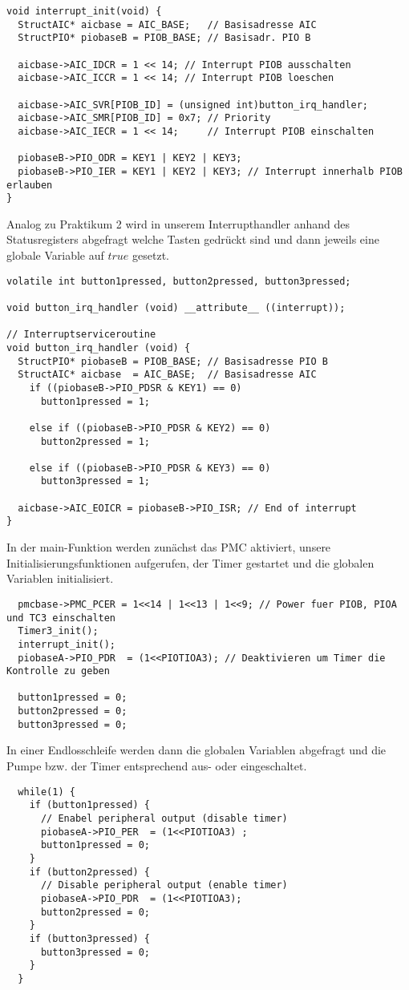\documentclass[11pt,a4paper,parskip=half]{scrartcl}
\begin{document}
\begin{lstlisting}
void interrupt_init(void) {
  StructAIC* aicbase = AIC_BASE;   // Basisadresse AIC
  StructPIO* piobaseB = PIOB_BASE; // Basisadr. PIO B

  aicbase->AIC_IDCR = 1 << 14; // Interrupt PIOB ausschalten
  aicbase->AIC_ICCR = 1 << 14; // Interrupt PIOB loeschen

  aicbase->AIC_SVR[PIOB_ID] = (unsigned int)button_irq_handler;
  aicbase->AIC_SMR[PIOB_ID] = 0x7; // Priority
  aicbase->AIC_IECR = 1 << 14;     // Interrupt PIOB einschalten

  piobaseB->PIO_ODR = KEY1 | KEY2 | KEY3;
  piobaseB->PIO_IER = KEY1 | KEY2 | KEY3; // Interrupt innerhalb PIOB erlauben
}
\end{lstlisting}

\newpage

Analog zu Praktikum 2 wird in unserem Interrupthandler anhand des Statusregisters abgefragt welche Tasten gedrückt sind und dann jeweils eine globale Variable auf $true$ gesetzt.

\begin{lstlisting}
volatile int button1pressed, button2pressed, button3pressed;

void button_irq_handler (void) __attribute__ ((interrupt));

// Interruptserviceroutine
void button_irq_handler (void) {
  StructPIO* piobaseB = PIOB_BASE; // Basisadresse PIO B
  StructAIC* aicbase  = AIC_BASE;  // Basisadresse AIC
    if ((piobaseB->PIO_PDSR & KEY1) == 0)
      button1pressed = 1;

    else if ((piobaseB->PIO_PDSR & KEY2) == 0)
      button2pressed = 1;

    else if ((piobaseB->PIO_PDSR & KEY3) == 0)
      button3pressed = 1;

  aicbase->AIC_EOICR = piobaseB->PIO_ISR; // End of interrupt
}
\end{lstlisting}

In der main-Funktion werden zunächst das PMC aktiviert, unsere Initialisierungsfunktionen aufgerufen, der Timer gestartet und die globalen Variablen initialisiert.

\begin{lstlisting}
  pmcbase->PMC_PCER = 1<<14 | 1<<13 | 1<<9; // Power fuer PIOB, PIOA und TC3 einschalten
  Timer3_init();
  interrupt_init();
  piobaseA->PIO_PDR  = (1<<PIOTIOA3); // Deaktivieren um Timer die Kontrolle zu geben

  button1pressed = 0;
  button2pressed = 0;
  button3pressed = 0;
\end{lstlisting}

In einer Endlosschleife werden dann die globalen Variablen abgefragt und die Pumpe bzw. der Timer entsprechend aus- oder eingeschaltet.

\begin{lstlisting}
  while(1) {
    if (button1pressed) {
      // Enabel peripheral output (disable timer)
      piobaseA->PIO_PER  = (1<<PIOTIOA3) ;
      button1pressed = 0;
    }
    if (button2pressed) {
      // Disable peripheral output (enable timer)
      piobaseA->PIO_PDR  = (1<<PIOTIOA3);
      button2pressed = 0;
    }
    if (button3pressed) {
      button3pressed = 0;
    }
  }
\end{lstlisting}
\end{document}
